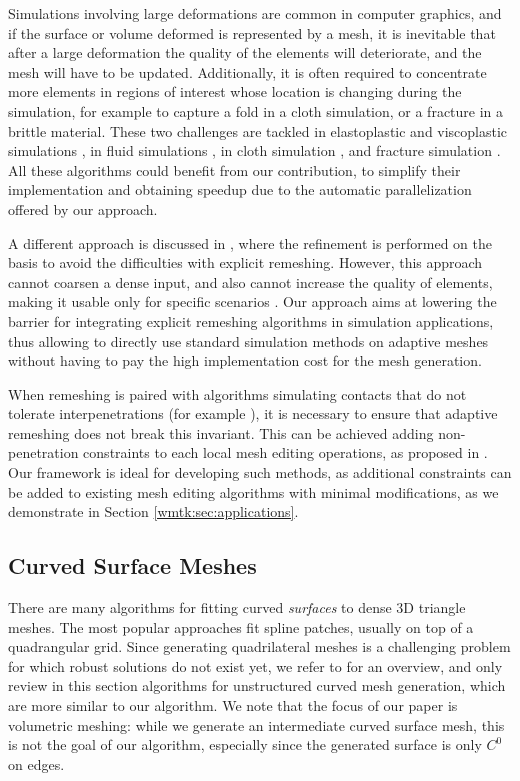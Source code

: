 Simulations involving large deformations are common in computer graphics, and if the surface or volume deformed is represented by a mesh, it is inevitable that after a large deformation the quality of the elements will deteriorate, and the mesh will have to be updated. Additionally, it is often required to concentrate more elements in regions of interest whose location is changing during the simulation, for example to capture a fold in a cloth simulation, or a fracture in a brittle material.
%
These two challenges are tackled in elastoplastic and viscoplastic simulations \cite{Hutchinson:1996,Bargteil:2007,Wicke:2010,Wojtan:2008}, in fluid simulations \cite{Misztal:2012,Klingner:2006,Ando:2013,Chentanez:2007,clausen:2013}, in cloth simulation \cite{Villard:2002,Bender:2013,Li:2005,Narain:2012,Narain:2013,Pfaff:2014,Simnett:2009}, and fracture simulation \cite{Busaryev:2013}. All these algorithms could benefit from our contribution, to simplify their implementation and obtaining speedup due to the automatic parallelization offered by our approach.

A different approach is discussed in \cite{Grinspun:2002}, where the refinement is performed on the basis to avoid the difficulties with explicit remeshing. However, this approach cannot coarsen a dense input, and also cannot increase the quality of elements, making it usable only for specific scenarios \cite{Grinspun:2002}. Our approach aims at lowering the barrier for integrating explicit remeshing algorithms in simulation applications, thus allowing to directly use standard simulation methods on adaptive meshes without having to pay the high implementation cost for the mesh generation.

When remeshing is paired with algorithms simulating contacts that do not tolerate interpenetrations (for example \cite{Li2020IPC}), it is necessary to ensure that adaptive remeshing does not break this invariant. This can be achieved adding non-penetration constraints to each local mesh editing operations, as proposed in \cite{Brochu:2012}. Our framework is ideal for developing such methods, as additional constraints can be added to existing mesh editing algorithms with minimal modifications, as we demonstrate in Section \ref{wmtk:sec:applications}.


\subsection{Curved Surface Meshes}
There are many algorithms for fitting curved \emph{surfaces} to dense 3D triangle meshes. The most popular approaches fit spline patches, usually on top of a quadrangular grid. Since generating quadrilateral meshes is a challenging problem for which robust solutions do not exist yet, we refer to \cite{QUADSTAR2012} for an overview, and only review in this section algorithms for unstructured curve{d} mesh generation, which are more similar to our algorithm. We note that the focus of our paper is volumetric meshing: while we generate an intermediate curved surface mesh, this is not the goal of our algorithm, especially since the generated surface is only $C^0$ on edges.

